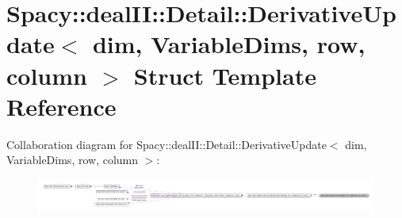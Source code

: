 \hypertarget{structSpacy_1_1dealII_1_1Detail_1_1DerivativeUpdate}{\section{\-Spacy\-:\-:deal\-I\-I\-:\-:\-Detail\-:\-:\-Derivative\-Update$<$ dim, \-Variable\-Dims, row, column $>$ \-Struct \-Template \-Reference}
\label{structSpacy_1_1dealII_1_1Detail_1_1DerivativeUpdate}
}


\-Collaboration diagram for \-Spacy\-:\-:deal\-I\-I\-:\-:\-Detail\-:\-:\-Derivative\-Update$<$ dim, \-Variable\-Dims, row, column $>$\-:
\nopagebreak
\begin{figure}[H]
\begin{center}
\leavevmode
\includegraphics[width=350pt]{structSpacy_1_1dealII_1_1Detail_1_1DerivativeUpdate__coll__graph}
\end{center}
\end{figure}
